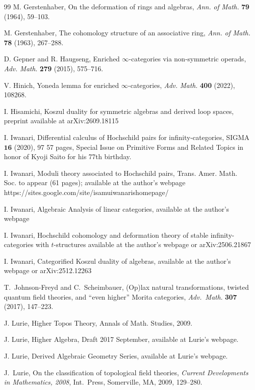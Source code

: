 \documentclass[leqno,12pt]{amsart}
\theoremstyle{plain}
\theoremstyle{definition}
\begin{document}
\begin{thebibliography}{99}
M. Gerstenhaber,
On the deformation of rings and algebras,
\emph{Ann. of Math.} \textbf{79} (1964), 59--103.

M. Gerstenhaber,
The cohomology structure of an associative ring,
\emph{Ann. of Math.} \textbf{78} (1963), 267--288.

D. Gepner and R. Haugseng,
Enriched $\infty$-categories via non-symmetric operads,
\emph{Adv. Math.} \textbf{279} (2015), 575--716.

V. Hinich,
Yoneda lemma for enriched $\infty$-categories,
\emph{Adv. Math.} \textbf{400} (2022), 108268.

I. Hisamichi,
Koszul duality for symmetric algebras and derived loop spaces,
preprint available at arXiv:2609.18115

I. Iwanari,
Differential calculus of Hochschild pairs for infinity-categories,
SIGMA $\mathbf{16}$ (2020), 97  57 pages,
Special Issue on Primitive Forms and Related Topics in honor of Kyoji Saito for his 77th birthday.

I. Iwanari,
Moduli theory associated to Hochschild pairs,
Trans. Amer. Math. Soc. to appear (61 pages); available at the author's webpage https://sites.google.com/site/isamuiwanarishomepage/

I. Iwanari,
Algebraic Analysis of linear categories,
available at the author's webpage

I. Iwanari,
Hochschild cohomology and deformation theory of stable infinity-categories with $t$-structures
available at the author's webpage or arXiv:2506.21867

I. Iwanari,
Categorified Koszul duality of algebras,
available at the author's webpage or arXiv:2512.12263

T.~Johnson-Freyd and C.~Scheimbauer,
(Op)lax natural transformations, twisted quantum field theories, and ``even higher'' Morita categories,
\emph{Adv.\ Math.} \textbf{307} (2017), 147--223.

J. Lurie,
Higher Topos Theory,
Annals of Math. Studies, 2009.

J. Lurie,
Higher Algebra,
Draft 2017 September, available at Lurie's webpage.

J. Lurie,
Derived Algebraic Geometry Series,
available at Lurie's webpage.

J.~Lurie,
On the classification of topological field theories,
\emph{Current Developments in Mathematics, 2008},
Int.\ Press, Somerville, MA, 2009, 129--280.


\end{thebibliography}
\end{document}
